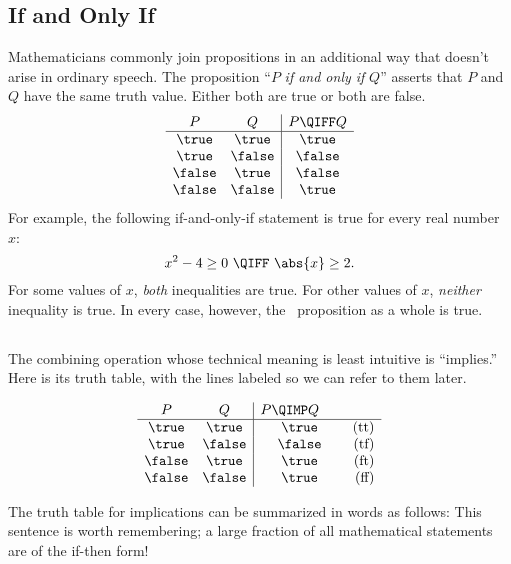 \subsection{If and Only If}

Mathematicians commonly join propositions in an additional way that
doesn't arise in ordinary speech.  The proposition ``$P$ \emph{if and
  only if} $Q$'' asserts that $P$ and $Q$ have the same truth value.
Either both are true or both are false.
\[
\begin{array}{cc|c}
P & Q & P \QIFF Q \\ \hline
\true & \true & \true \\
\true & \false & \false \\
\false & \true & \false \\
\false & \false & \true
\end{array}
\]
For example, the following if-and-only-if statement is true for every real
number $x$:
\[
x^2 - 4 \geq 0\ \QIFF\ \abs{x} \geq 2.
\]
For some values of $x$, \textit{both} inequalities are true.  For
other values of $x$, \textit{neither} inequality is true.  In every
case, however, the \QIFF\ proposition as a whole is true.

\subsection{\QIMPLIES}

The combining operation whose technical meaning is least intuitive is
``implies.''  Here is its truth table, with the lines labeled so we
can refer to them later.

\[
\begin{array}{cc|cr}
    P  &   Q    & \parbox[b]{13ex}{$P \QIMP Q$} \\ \hline
\true  & \true  & \true & \text{(tt)}\\
\true  & \false & \false  & \text{(tf)}\\
\false & \true  & \true  & \text{(ft)}\\
\false & \false & \true  & \text{(ff)}
\end{array}
\]

The truth table for implications can be summarized in words as
follows:
This sentence is worth remembering; a large fraction of all
mathematical statements are of the if-then form!

